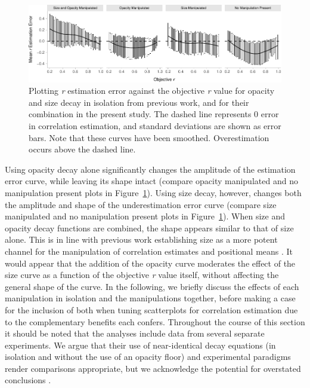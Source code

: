 \documentclass[manuscript, review, anonymous, screen]{acmart}
\begin{document}
\begin{figure}

{\centering \includegraphics[width=1\textwidth,height=\textheight]{size_and_opacity_files/figure-pdf/fig-est-multi-exp-1.pdf}

}

\caption{\label{fig-est-multi-exp}Plotting \emph{r} estimation error
against the objective \emph{r} value for opacity and size decay in
isolation from previous work, and for their combination in the present
study. The dashed line represents 0 error in correlation estimation, and
standard deviations are shown as error bars. Note that these curves have
been smoothed. Overestimation occurs above the dashed line.}

\end{figure}

Using opacity decay alone significantly changes the amplitude of the
estimation error curve, while leaving its shape intact (compare opacity
manipulated and no manipulation present plots in
Figure~\ref{fig-est-multi-exp}). Using size decay, however, changes both
the amplitude and shape of the underestimation error curve (compare size
manipulated and no manipulation present plots in
Figure~\ref{fig-est-multi-exp}). When size and opacity decay functions
are combined, the shape appears similar to that of size alone. This is
in line with previous work establishing size as a more potent channel
for the manipulation of correlation estimates \citep{strain_2023b} and
positional means \citep{hong_2021}. It would appear that the addition of
the opacity curve moderates the effect of the size curve as a function
of the objective \emph{r} value itself, without affecting the general
shape of the curve. In the following, we briefly discuss the effects of
each manipulation in isolation and the manipulations together, before
making a case for the inclusion of both when tuning scatterplots for
correlation estimation due to the complementary benefits each confers.
Throughout the course of this section it should be noted that the
analyses include data from several separate experiments. We argue that
their use of near-identical decay equations (in isolation and without
the use of an opacity floor) and experimental paradigms render
comparisons appropriate, but we acknowledge the potential for overstated
conclusions \citep{strain_2023, strain_2023b}.
\end{document}
